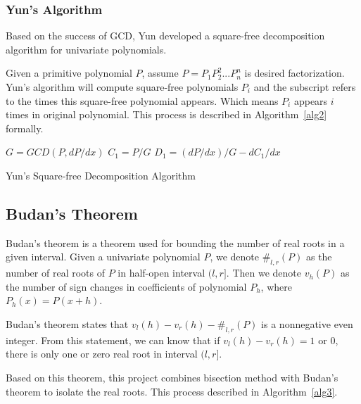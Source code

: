 \subsubsection{Yun's Algorithm}

Based on the success of GCD, Yun developed a square-free decomposition
algorithm for univariate polynomials. 

Given a primitive polynomial $P$, assume $P=P_1P_2^2...P_n^n$ is desired
factorization. Yun's algorithm will compute square-free polynomials $P_i$ and
the subscript refers to the times this square-free polynomial appears. Which
means $P_i$ appears $i$ times in original polynomial. This process is described in
Algorithm~\ref{alg2} formally.

\begin{algorithm}[H]
\label{alg2}
\SetAlgoLined


  $G = GCD(P, dP/dx)$\;
  $C_1=P/G$\;
  $D_1 = (dP/dx)/G - dC_1/dx$\;



\caption{Yun's Square-free Decomposition Algorithm}
\end{algorithm}

\subsection{Budan's Theorem}

Budan's theorem is a theorem used for bounding the number of real roots in a
given interval. Given a univariate polynomial $P$, we denote
$\#_{l,r}(P)$ as the number of real roots of $P$ in half-open interval $(l,r]$.
Then we denote $v_h(P)$ as the number of sign changes in coefficients of
polynomial $P_h$, where $P_h(x) = P(x+h)$.

Budan's theorem states that $v_l(h) - v_r(h) - \#_{l,r}(P)$ is a nonnegative
even integer. From this statement, we can know that if $v_l(h) - v_r(h) = 1
\text{ or } 0$, there is only one or zero real root in interval $(l,r]$. 

Based on this theorem, this project combines bisection method with Budan's
theorem to isolate the real roots.  This process described in
Algorithm~\ref{alg3}.

